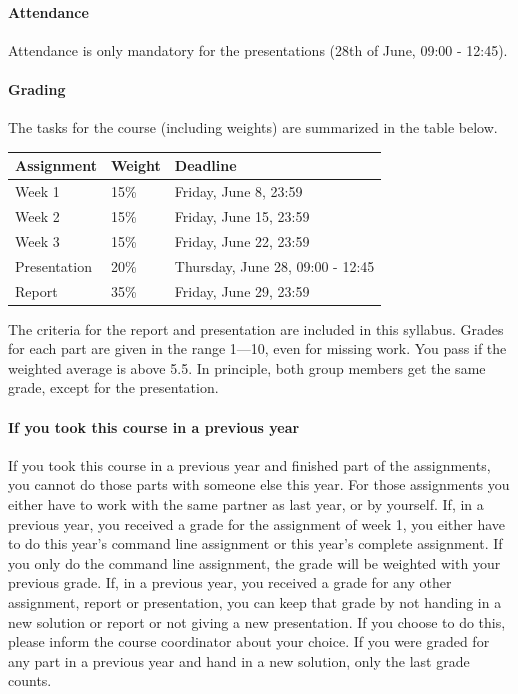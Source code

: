 \documentclass[a4paper]{report}
\begin{document}
\paragraph{Attendance}
Attendance is only mandatory for the presentations (28th of June, 09:00 - 12:45).


\paragraph{Grading}
The tasks for the course (including weights) are summarized in the table below.

\begin{table}[h!]
	\begin{tabular}{| l | l | l |}
		\hline
		\textbf{Assignment} & \textbf{Weight}	& \textbf{Deadline}					\\
		\hline
		Week 1				&	15\%			& Friday, June 8, 23:59				\\
		\hline
		Week 2				&	15\%			& Friday, June 15, 23:59			\\
		\hline
		Week 3				&	15\%			& Friday, June 22, 23:59			\\
		\hline
		Presentation		&	20\%			& Thursday, June 28, 09:00 - 12:45	\\
		\hline
		Report				&	35\%			& Friday, June 29, 23:59			\\
		\hline
	\end{tabular}
\end{table}
The criteria for the report and presentation are included in this syllabus. Grades for each part are given in the range 1—10, even for missing work. You pass if the weighted average is above 5.5. In principle, both group members get the same grade, except for the presentation.

\paragraph{If you took this course in a previous year}
If you took this course in a previous year and finished part of the assignments, you cannot do those parts with someone else this year. For those assignments you either have to work with the same partner as last year, or by yourself.
If, in a previous year, you received a grade for the assignment of week 1, you either have to do this year’s command line assignment or this year’s complete assignment. If you only do the command line assignment, the grade will be weighted with your previous grade.
If, in a previous year, you received a grade for any other assignment, report or presentation, you can keep that grade by not handing in a new solution or report or not giving a new presentation. If you choose to do this, please inform the course coordinator about your choice.
If you were graded for any part in a previous year and hand in a new solution, only the last grade counts.
\end{document}

